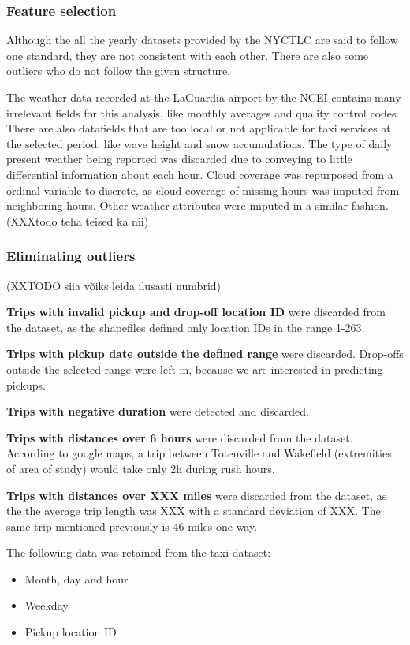 \documentclass[11pt]{article}
\begin{document}
\subsubsection{Feature selection}

Although the all the yearly datasets provided by the NYCTLC are said to follow one standard, they are not consistent with each other. There are also some outliers who do not follow the given structure. 

The weather data recorded at the LaGuardia airport by the NCEI \cite{weatherDataGuide} contains many irrelevant fields for this analysis, like monthly averages and quality control codes. There are also datafields that are too local or not applicable for taxi services at the selected period, like wave height and snow accumulations. The type of daily present weather being reported was discarded due to conveying to little differential information about each hour. Cloud coverage was repurposed from a ordinal variable to discrete, as cloud coverage of missing hours was imputed from neighboring hours. Other weather attributes were imputed in a similar fashion.(XXXtodo teha teised ka nii)

\subsubsection{Eliminating outliers}

(XXTODO siia võiks leida ilusasti numbrid)

\textbf{Trips with invalid pickup and drop-off location ID} were discarded from the dataset, as the shapefiles defined only location IDs in the range 1-263.

\textbf{Trips with pickup date outside the defined range} were discarded. Drop-offs outside the selected range were left in, because we are interested in predicting pickups.

\textbf{Trips with negative duration} were detected and discarded.

\textbf{Trips with distances over 6 hours} were discarded from the dataset. According to google maps, a trip between Totenville and Wakefield (extremities of area of study) would take only 2h during rush hours.

\textbf{Trips with distances over XXX miles} were discarded from the dataset, as the the average trip length was XXX with a standard deviation of XXX. The same trip mentioned previously is 46 miles one way.


The following data was retained from the taxi dataset:
\begin{itemize}
    \item Month, day and hour
    \item Weekday
    \item Pickup location ID
\end{itemize}
\end{document}
